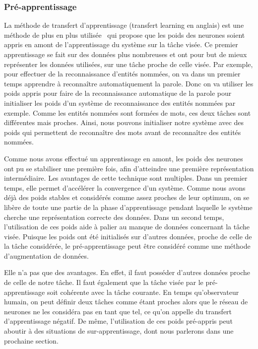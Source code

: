 \subsubsection{Pré-apprentissage}
La méthode de transfert d'apprentissage (transfert learning en anglais) est une méthode de plus en plus utilisée~\cite{Pan2010,Weiss2016} qui propose que les poids des neurones soient appris en amont de l'apprentissage du système sur la tâche visée. Ce premier apprentissage se fait sur des données plus nombreuses et ont pour but de mieux représenter les données utilisées, sur une tâche proche de celle visée. Par exemple, pour effectuer de la reconnaissance d'entités nommées, on va dans un premier temps apprendre à reconnaître automatiquement la parole. Donc on va utiliser les poids appris pour faire de la reconnaissance automatique de la parole pour initialiser les poids d'un système de reconnaissance des entités nommées par exemple. Comme les entités nommées sont formées de mots, ces deux tâches sont différentes mais proches. Ainsi, nous pouvons initialiser notre système avec des poids qui permettent de reconnaître des mots avant de reconnaître des entités nommées.

Comme nous avons effectué un apprentissage en amont, les poids des neurones ont pu se stabiliser une première fois, afin d'atteindre une première représentation intermédiaire. Les avantages de cette technique sont multiples. Dans un premier temps, elle permet d’accélérer la convergence d'un système. Comme nous avons déjà des poids stables et considérés comme assez proches de leur optimum, on se libère de toute une partie de la phase d'apprentissage pendant laquelle le système cherche une représentation correcte des données. Dans un second temps, l'utilisation de ces poids aide à palier au manque de données concernant la tâche visée. Puisque les poids ont été initialisés sur d'autres données, proche de celle de la tâche considérée, le pré-apprentissage peut être considéré comme une méthode d'augmentation de données.

Elle n'a pas que des avantages. En effet, il faut posséder d'autres données proche de celle de notre tâche. Il faut également que la tâche visée par le pré-apprentissage soit cohérente avec la tâche courante. En temps qu'observateur humain, on peut définir deux tâches comme étant proches alors que le réseau de neurones ne les considéra pas en tant que tel, ce qu'on appelle du transfert d'apprentissage négatif. De même, l'utilisation de ces poids pré-appris peut aboutir à des situations de sur-apprentissage, dont nous parlerons dans une prochaine section.

